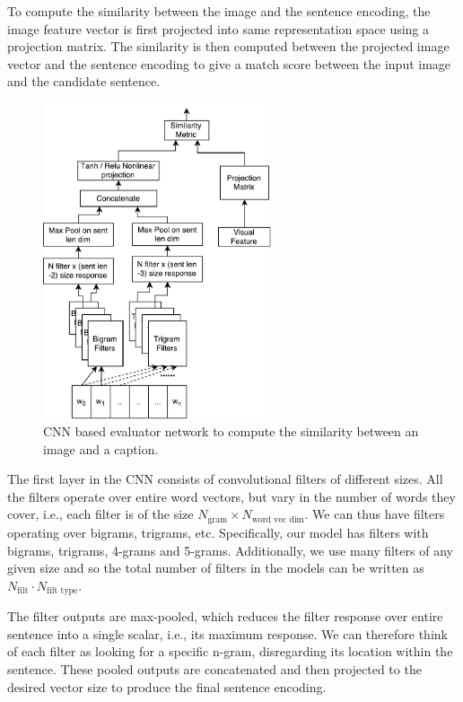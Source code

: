 To compute the similarity between the image and the sentence encoding,
the image feature vector is first projected into same representation
space using a projection matrix.
The similarity is then computed between the projected image vector and
the sentence encoding to give a match score between the input image
and the candidate sentence.

\begin{figure}[t] 
  \centering
  \includegraphics[width=0.6\textwidth]{./images/CnnEval.pdf} 
  \caption{CNN based evaluator network to compute the similarity between 
    an image and a caption.}
  \label{fig:CNNEval} 
\end{figure}


The first layer in the CNN consists of convolutional filters of
different sizes.  
All the filters operate over entire word vectors, but vary in the
number of words they cover, i.e., each filter is of the size
$N_{\text{gram}} \times N_{\text{word vec dim}}$. 
We can thus have filters operating over bigrams, trigrams, etc.
Specifically, our model has filters with bigrams, trigrams, 4-grams and
5-grams. 
Additionally, we use many filters of any given size and so the total
number of filters in the models can be written as
$N_{\text{filt}} \cdot N_{\text{filt type}}$.

The filter outputs are max-pooled, which reduces the filter response
over entire sentence into a single scalar, i.e., its maximum
response. 
We can therefore think of each filter as looking for a specific
n-gram, disregarding its location within the sentence.
These pooled outputs are concatenated and then projected to the
desired vector size to produce the final sentence encoding.

